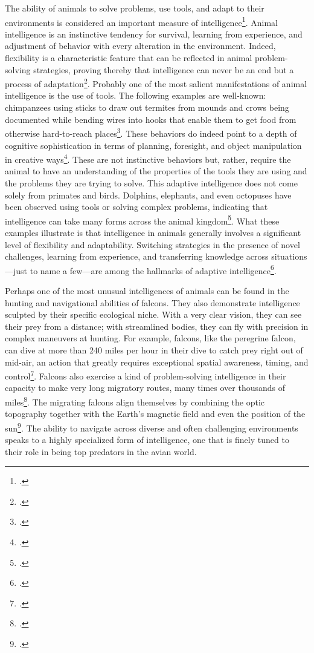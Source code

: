 \documentclass[12pt]{article}
\begin{document}
The ability of animals to solve problems, use tools, and adapt to their environments is considered an important measure of intelligence\footcite{emery2004cognitive}. Animal intelligence is an instinctive tendency for survival, learning from experience, and adjustment of behavior with every alteration in the environment. 
Indeed, flexibility is a characteristic feature that can be reflected in animal problem-solving strategies, 
proving thereby that intelligence can never be an end but a process of adaptation\footcite{dewaal2016are}. 
Probably one of the most salient manifestations of animal intelligence is the use of tools. The following examples are well-known: chimpanzees using sticks to draw out termites from mounds and crows being documented while bending wires into hooks that enable them to get food from otherwise hard-to-reach places\footcite{hunt2000crows}. These behaviors do indeed point to a depth of cognitive sophistication in terms of planning, foresight, and object manipulation in creative ways\footcite{emery2004cognitive}. These are not instinctive behaviors but, rather, require the animal to have an understanding of the properties of the tools they are using and the problems they are trying to solve. This adaptive intelligence does not come solely from primates and birds. Dolphins, elephants, and even octopuses have been observed using tools or solving complex problems, indicating that intelligence can take many forms across the animal kingdom\footcite{janik2006communication}. What these examples illustrate is that intelligence in animals generally involves a significant level of flexibility and adaptability. Switching strategies in the presence of novel challenges, learning from experience, and transferring knowledge across situations—just to name a few—are among the hallmarks of adaptive intelligence\footcite{dewaal2016are}.

Perhaps one of the most unusual intelligences of animals can be found in the hunting and navigational abilities of falcons. They also demonstrate intelligence sculpted by their specific ecological niche. With a very clear vision, they can see their prey from a distance; with streamlined bodies, they can fly with precision in complex maneuvers at hunting. For example, falcons, like the peregrine falcon, can dive at more than 240 miles per hour in their dive to catch prey right out of mid-air, an action that greatly requires exceptional spatial awareness, timing, and control\footcite{tucker2000gliding}. Falcons also exercise a kind of problem-solving intelligence in their capacity to make very long migratory routes, many times over thousands of miles\footcite{wiltschko2003navigation}. The migrating falcons align themselves by combining the optic topography together with the Earth's magnetic field and even the position of the sun\footcite{wiltschko2003navigation}. The ability to navigate across diverse and often challenging environments speaks to a highly specialized form of intelligence, one that is finely tuned to their role in being top predators in the avian world.
\end{document}

